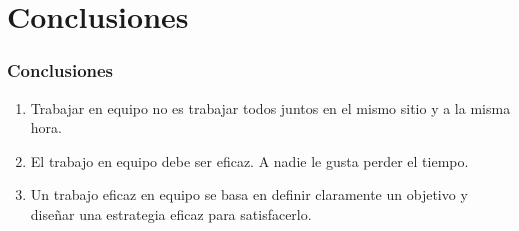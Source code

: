 \documentclass[a4paper,slidestop,xcolor=pst,dvips,blue]{beamer}
\begin{document}
\section{Conclusiones}

\begin{frame}[c]
	\frametitle{Conclusiones}
	\begin{enumerate}[<+->]
		\item Trabajar en equipo no es trabajar todos juntos en el mismo sitio y a la misma hora.
		\item El trabajo en equipo debe ser eficaz. A nadie le gusta perder el tiempo.
		\item Un trabajo eficaz en equipo se basa en definir claramente un objetivo y diseñar una estrategia eficaz para satisfacerlo.
	\end{enumerate}
\end{frame}
\end{document}
